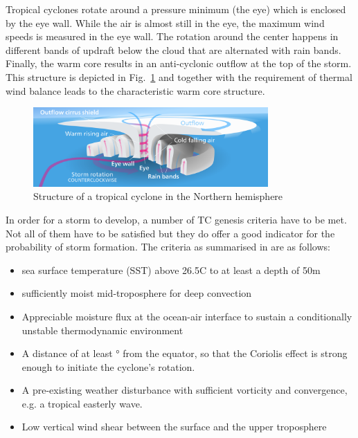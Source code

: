 Tropical cyclones rotate around a pressure minimum (the eye) which is enclosed by the eye wall. While the air is almost still in the eye, the maximum wind speeds is measured in the eye wall. The rotation around the center happens in different bands of updraft below the cloud that are alternated with rain bands. Finally, the warm core results in an anti-cyclonic outflow at the top of the storm. This structure is depicted in Fig.~\ref{fig:tc-structure} and together with the requirement of thermal wind balance leads to the characteristic warm core structure.
\begin{figure}[ht]
	\centering
	\includegraphics[width=0.8\textwidth]{img/hurricane-structure.png}
	\caption{Structure of a tropical cyclone in the Northern hemisphere~\cite{hurricane-structure}}
	\label{fig:tc-structure}
\end{figure}
In order for a storm to develop, a number of TC genesis criteria have to be met. Not all of them have to be satisfied but they do offer a good indicator for the probability of storm formation.
The criteria as summarised in \cite{lohmann-storms} are as follows:
\begin{itemize}
	\item sea surface temperature (SST) above 26.5\degree C to at least a depth of 50m
	\item sufficiently moist mid-troposphere for deep convection
	\item Appreciable moisture flux at the ocean-air interface to sustain a conditionally unstable thermodynamic environment \cite{moisture-flux}
	\item A distance of at least \unit[5]{\degree} from the equator, so that the Coriolis effect is strong enough to initiate the cyclone's rotation. \cite{coriolis}
	\item A pre-existing weather disturbance with sufficient vorticity and convergence, e.g. a tropical easterly wave.
	\item Low vertical wind shear between the surface and the upper troposphere
\end{itemize}


